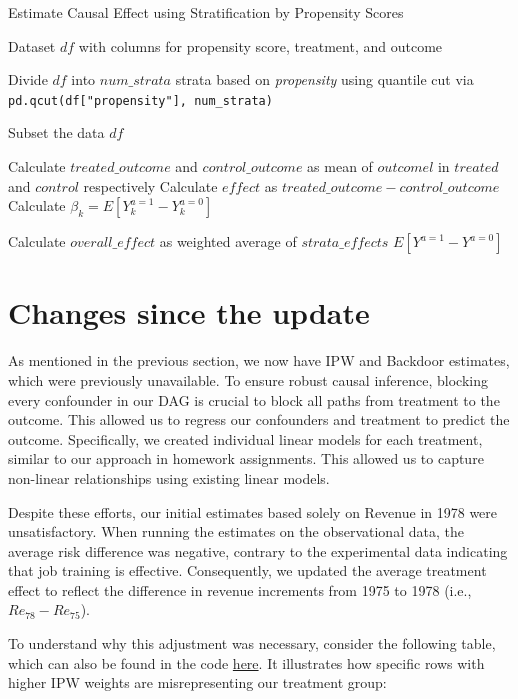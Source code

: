 \documentclass[12pt]{article}
\begin{document}
\begin{algorithm}[H]
\caption{Estimate Causal Effect using Stratification by Propensity Scores}
\begin{algorithmic}[1]
\Require Dataset $df$ with columns for propensity score, treatment, and outcome

\State Divide $df$ into $num\_strata$ strata based on \textit{propensity} using quantile cut via {\tt pd.qcut(df["propensity"], num\_strata)}

    \State Subset the data $df$

        \State Calculate $treated\_outcome$ and $control\_outcome$ as mean of $outcomel$ in $treated$ and $control$ respectively
        \State Calculate $effect$ as $treated\_outcome - control\_outcome$
        \State Calculate $\beta_{k} = E[Y^{a=1}_k - Y^{a=0}_k]$
    \EndIf
\EndFor

\State Calculate $overall\_effect$ as weighted average of $strata\_effects$
\State \Return $E[Y^{a=1} - Y^{a=0}]$
\end{algorithmic}
\end{algorithm}

\section{Changes since the update}

As mentioned in the previous section, we now have IPW and Backdoor estimates, which were previously unavailable. To ensure robust causal inference, blocking every confounder in our DAG is crucial to block all paths from treatment to the outcome. This allowed us to regress our confounders and treatment to predict the outcome. Specifically, we created individual linear models for each treatment, similar to our approach in homework assignments. This allowed us to capture non-linear relationships using existing linear models.

Despite these efforts, our initial estimates based solely on Revenue in 1978 were unsatisfactory. When running the estimates on the observational data, the average risk difference was negative, contrary to the experimental data indicating that job training is effective. Consequently, we updated the average treatment effect to reflect the difference in revenue increments from 1975 to 1978 (i.e., $Re_{78} - Re_{75}$).

To understand why this adjustment was necessary, consider the following table, which can also be found in the code \href{https://github.com/cs396s24/Proj-Job-Training/blob/main/prop/1_ipw_re78.ipynb}{here}. It illustrates how specific rows with higher IPW weights are misrepresenting our treatment group:
\end{document}
